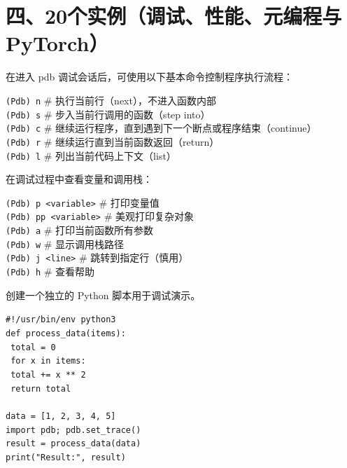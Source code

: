 \documentclass[a4paper, 12pt]{article}
\begin{document}
\section*{四、20个实例（调试、性能、元编程与PyTorch）}


\begin{tcolorbox}[instancestyle, title=实例1：pdb 常用调试命令（一）]
在进入 pdb 调试会话后，可使用以下基本命令控制程序执行流程：

\texttt{(Pdb) n} \quad \# 执行当前行（next），不进入函数内部 \\
\texttt{(Pdb) s} \quad \# 步入当前行调用的函数（step into） \\
\texttt{(Pdb) c} \quad \# 继续运行程序，直到遇到下一个断点或程序结束（continue） \\
\texttt{(Pdb) r} \quad \# 继续运行直到当前函数返回（return） \\
\texttt{(Pdb) l} \quad \# 列出当前代码上下文（list）
\end{tcolorbox}

\begin{tcolorbox}[instancestyle, title=实例2：pdb 常用调试命令（二）]
在调试过程中查看变量和调用栈：

\texttt{(Pdb) p <variable>} \quad \# 打印变量值 \\
\texttt{(Pdb) pp <variable>} \quad \# 美观打印复杂对象 \\
\texttt{(Pdb) a} \quad \# 打印当前函数所有参数 \\
\texttt{(Pdb) w} \quad \# 显示调用栈路径 \\
\texttt{(Pdb) j <line>} \quad \# 跳转到指定行（慎用） \\
\texttt{(Pdb) h} \quad \# 查看帮助
\end{tcolorbox}

\begin{tcolorbox}[instancestyle, title=实例3：在脚本中插入 pdb 断点]
创建一个独立的 Python 脚本用于调试演示。

\texttt{\#!/usr/bin/env python3} \\
\texttt{def process\_data(items):} \\
\texttt{    total = 0} \\
\texttt{    for x in items:} \\
\texttt{        total += x ** 2} \\
\texttt{    return total} \\
\texttt{} \\
\texttt{data = [1, 2, 3, 4, 5]} \\
\texttt{import pdb; pdb.set\_trace()} \\
\texttt{result = process\_data(data)} \\
\texttt{print("Result:", result)}
\end{tcolorbox}
\end{document}
